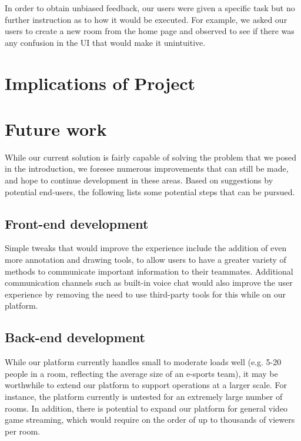 \documentclass[conference]{IEEEtran}
\begin{document}
    In order to obtain unbiased feedback, our users were given a specific task but no further instruction as to how it would be executed. For example, we asked our users to create a new room from the home page and observed to see if there was any confusion in the UI that would make it unintuitive.

\section{Implications of Project}

\section{Future work}

    While our current solution is fairly capable of solving the problem that we posed in the introduction, we foresee numerous improvements that can still be made, and hope to continue development in these areas. Based on suggestions by potential end-users, the following lists some potential steps that can be pursued.

\subsection{Front-end development}

    Simple tweaks that would improve the experience include the addition of even more annotation and drawing tools, to allow users to have a greater variety of methods to communicate important information to their teammates. Additional communication channels such as built-in voice chat would also improve the user experience by removing the need to use third-party tools for this while on our platform.

\subsection{Back-end development}

    While our platform currently handles small to moderate loads well (e.g. 5-20 people in a room, reflecting the average size of an e-sports team), it may be worthwhile to extend our platform to support operations at a larger scale. For instance, the platform currently is untested for an extremely large number of rooms. In addition, there is potential to expand our platform for general video game streaming, which would require on the order of up to thousands of viewers per room.
\end{document}
